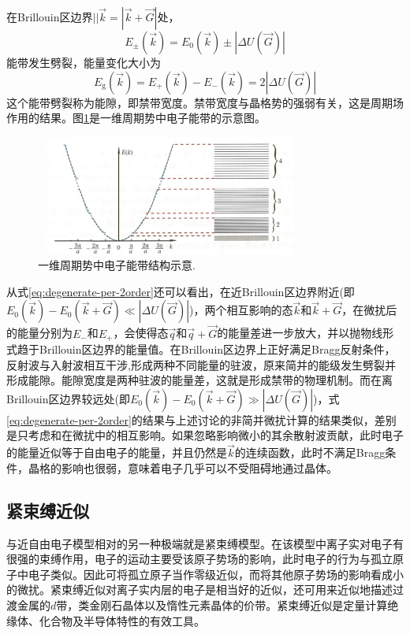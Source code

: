 在Brillouin区边界$||\vec k=|\vec k+\vec G|$处，
\begin{equation}
	E_{\pm}(\vec k)=E_0(\vec k)\pm|\Delta U(\vec G)|
	\label{eq:Electron-degenerate-per-2order}
\end{equation}
能带发生劈裂，能量变化大小为
\begin{equation}
	E_{\mathrm{g}}(\vec k)=E_{+}(\vec k)-E_{-}(\vec k)=2|\Delta U(\vec G)|
	\label{eq:Electron-Basic-Gap}
\end{equation}
这个能带劈裂称为能隙，即禁带宽度。禁带宽度与晶格势的强弱有关，这是周期场作用的结果。图\ref{Fig:Electron-Band-gap}是一维周期势中电子能带的示意图。
\begin{figure}[h!]
\centering
\vspace*{-0.05in}
\includegraphics[height=1.55in,width=3.50in,viewport=0 0 130 60,clip]{Figures/Electron-Band_Gap.png}
\caption{\small \textrm{一维周期势中电子能带结构示意.}}%
\label{Fig:Electron-Band-gap}
\end{figure}

从式\eqref{eq:degenerate-per-2order}还可以看出，在近Brillouin区边界附近(即$E_0(\vec k)-E_0(\vec k+\vec G)\ll|\Delta U(\vec G)|$)，两个相互影响的态$\vec k$和$\vec k+\vec G$，在微扰后的能量分别为$E_-$和$E_+$，会使得态$\vec q$和$\vec q+\vec G$的能量差进一步放大，并以抛物线形式趋于Brillouin区边界的能量值。在Brillouin区边界上正好满足Bragg反射条件，反射波与入射波相互干涉,形成两种不同能量的驻波，原来简并的能级发生劈裂并形成能隙。能隙宽度是两种驻波的能量差，这就是形成禁带的物理机制。而在离Brillouin区边界较远处(即$E_0(\vec k)-E_0(\vec k+\vec G)\gg|\Delta U(\vec G)|$)，式\eqref{eq:degenerate-per-2order}的结果与上述讨论的非简并微扰计算的结果类似，差别是只考虑和在微扰中的相互影响。如果忽略影响微小的其余散射波贡献，此时电子的能量近似等于自由电子的能量，并且仍然是$\vec k$的连续函数，此时不满足Bragg条件，晶格的影响也很弱，意味着电子几乎可以不受阻碍地通过晶体。

\subsection{紧束缚近似} 
与近自由电子模型相对的另一种极端就是紧束缚模型。在该模型中离子实对电子有很强的束缚作用，电子的运动主要受该原子势场的影响，此时电子的行为与孤立原子中电子类似。因此可将孤立原子当作零级近似，而将其他原子势场的影响看成小的微扰。紧束缚近似对离子实内层的电子是相当好的近似，还可用来近似地描述过渡金属的$d$带，类金刚石晶体以及惰性元素晶体的价带。紧束缚近似是定量计算绝缘体、化合物及半导体特性的有效工具。

